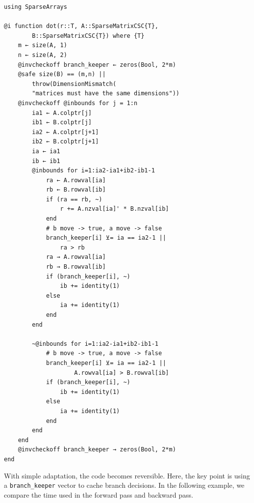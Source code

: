 \documentclass[aps,twocolumn,longbibliography,english,superscriptaddress]{revtex4-1}
\newcommand{\<}{\langle}
\renewcommand{\>}{\rangle}
\theoremstyle{definition}\newtheorem{definition}{\textit{Definition}}
\begin{document}
\begin{minipage}{.44\textwidth}
\begin{lstlisting}
using SparseArrays

@i function dot(r::T, A::SparseMatrixCSC{T},
        B::SparseMatrixCSC{T}) where {T}
    m ← size(A, 1)
    n ← size(A, 2)
    @invcheckoff branch_keeper ← zeros(Bool, 2*m)
    @safe size(B) == (m,n) || 
        throw(DimensionMismatch(
        "matrices must have the same dimensions"))
    @invcheckoff @inbounds for j = 1:n
        ia1 ← A.colptr[j]
        ib1 ← B.colptr[j]
        ia2 ← A.colptr[j+1]
        ib2 ← B.colptr[j+1]
        ia ← ia1
        ib ← ib1
        @inbounds for i=1:ia2-ia1+ib2-ib1-1
            ra ← A.rowval[ia]
            rb ← B.rowval[ib]
            if (ra == rb, ~)
                r += A.nzval[ia]' * B.nzval[ib]
            end
            # b move -> true, a move -> false
            branch_keeper[i] ⊻= ia == ia2-1 ||
                ra > rb
            ra → A.rowval[ia]
            rb → B.rowval[ib]
            if (branch_keeper[i], ~)
                ib += identity(1)
            else
                ia += identity(1)
            end
        end

        ~@inbounds for i=1:ia2-ia1+ib2-ib1-1
            # b move -> true, a move -> false
            branch_keeper[i] ⊻= ia == ia2-1 ||
                    A.rowval[ia] > B.rowval[ib]
            if (branch_keeper[i], ~)
                ib += identity(1)
            else
                ia += identity(1)
            end
        end
    end
    @invcheckoff branch_keeper → zeros(Bool, 2*m)
end
\end{lstlisting}
\end{minipage}

With simple adaptation, the code becomes reversible.
Here, the key point is using a \texttt{branch\_keeper} vector to cache branch decisions.
In the following example, we compare the time used in the forward pass and backward pass.
\end{document}
